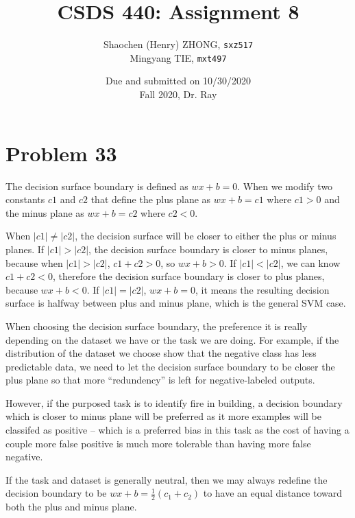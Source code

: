 \documentclass[12pt]{article}
\newcommand{\ilcode}{\texttt}
\begin{document}
\title{\textbf{CSDS 440: Assignment 8}}

\author{Shaochen (Henry) ZHONG, \ilcode{sxz517} \\ Mingyang TIE, \ilcode{mxt497}}
\date{Due and submitted on 10/30/2020 \\ Fall 2020, Dr. Ray}
\maketitle


\section{Problem 33}

The decision surface boundary is defined as $wx + b = 0$. When we modify two constants $c1$ and $c2$ that define the plus plane as $wx + b = c1$ where $c1 > 0$ and the minus plane as $wx + b = c2$ where $c2 < 0$.


When $|c1| \neq |c2|$, the decision surface will be closer to either the plus or minus planes. If $|c1| > |c2|$, the decision surface boundary is closer to minus planes, because when $|c1| > |c2|$, $c1 + c2 > 0$, so $wx + b > 0$. If $|c1| < |c2|$, we can know $c1 + c2 < 0$, therefore the decision surface boundary is closer to plus planes, because $wx + b < 0$. If $|c1| = |c2|$, $wx + b = 0$, it means the resulting decision surface is halfway between plus and minus plane, which is the general SVM case. \newline

When choosing the decision surface boundary, the preference it is really depending on the dataset we have or the task we are doing. For example, if the distribution of the dataset we choose show that the negative class has less predictable data, we need to let the decision surface boundary to be closer the plus plane so that more ``redundency'' is left for negative-labeled outputs.

However, if the purposed task is to identify fire in building, a decision boundary which is closer to minus plane will be preferred as it more examples will be classifed as positive -- which is a preferred bias in this task as the cost of having a couple more false positive is much more tolerable than having more false negative.

If the task and dataset is generally neutral, then we may always redefine the decision boundary to be $wx + b = \frac{1}{2}(c_1 + c_2)$ to have an equal distance toward both the plus and minus plane.
\end{document}
